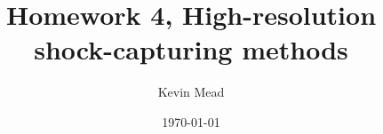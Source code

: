 %
%
%
%
%
%
%
%
%
%
%
%
%
%
%
%
%
%
%
%
%
%
%
%
%
%
%
%
%
%
%
%
%
%
%
%
%
%
%
%
%
%
%
%
%
%
%
%
%
 \title{Homework 4, High-resolution shock-capturing methods} 
\author{Kevin Mead}

\date{\today} 
\maketitle 






 
